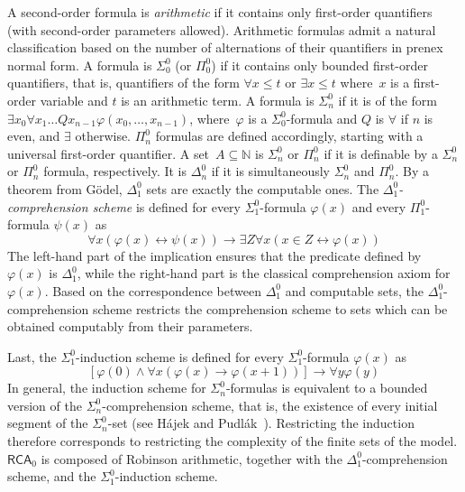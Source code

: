\documentclass{article}
\def\NN{\mathbb{N}}
\newcommand{\RCA}{\mathsf{RCA}}
\numberwithin{theorem}{section}
\theoremstyle{definition}
\begin{document}
A second-order formula is \emph{arithmetic} if it contains only first-order quantifiers (with second-order parameters allowed).  Arithmetic formulas admit a natural classification based on the number of alternations of their quantifiers in prenex normal form. A formula is $\Sigma^0_0$ (or $\Pi^0_0$) if it contains only bounded first-order quantifiers, that is, quantifiers of the form $\forall x \leq t$ or $\exists x \leq t$ where~$x$ is a first-order variable and $t$ is an arithmetic term. A formula is $\Sigma^0_n$ if it is of the form $\exists x_0 \forall x_1 \dots Q x_{n-1} \varphi(x_0, \dots, x_{n-1})$, where~$\varphi$ is a $\Sigma^0_0$-formula and $Q$ is $\forall$ if $n$ is even, and $\exists$ otherwise. $\Pi^0_n$ formulas are defined accordingly, starting with a universal first-order quantifier. A set~$A \subseteq \NN$ is $\Sigma^0_n$ or $\Pi^0_n$ if it is definable by a $\Sigma^0_n$ or $\Pi^0_n$ formula, respectively. It is $\Delta^0_n$ if it is simultaneously $\Sigma^0_n$ and $\Pi^0_n$. By a theorem from G\"odel, $\Delta^0_1$ sets are exactly the computable ones.
The \emph{$\Delta^0_1$-comprehension scheme} is defined for every $\Sigma^0_1$-formula $\varphi(x)$ and every $\Pi^0_1$-formula $\psi(x)$ as 
$$
\forall x(\varphi(x) \leftrightarrow \psi(x)) \to \exists Z \forall x(x \in Z \leftrightarrow \varphi(x))
$$
The left-hand part of the implication ensures that the predicate defined by $\varphi(x)$ is $\Delta^0_1$, while the right-hand part is the classical comprehension axiom for~$\varphi(x)$.
Based on the correspondence between $\Delta^0_1$ and computable sets, the $\Delta^0_1$-comprehension scheme restricts the comprehension scheme to sets which can be obtained computably from their parameters.

Last, the $\Sigma^0_1$-induction scheme is defined for every $\Sigma^0_1$-formula $\varphi(x)$ as
$$
[\varphi(0) \wedge \forall x(\varphi(x) \rightarrow \varphi(x+1))] \to \forall y \varphi(y)
$$
In general, the induction scheme for $\Sigma^0_n$-formulas is equivalent to a bounded version of the $\Sigma^0_n$-comprehension scheme, that is, the existence of every initial segment of the $\Sigma^0_n$-set (see H\'ajek and Pudl\'ak~\cite{hajek2017metamathematics}). Restricting the induction therefore corresponds to restrict\-ing the complexity of the finite sets of the model.
$\RCA_0$ is composed of Robinson arithmetic, together with the $\Delta^0_1$-comprehension scheme, and the $\Sigma^0_1$-induction scheme.
\end{document}
